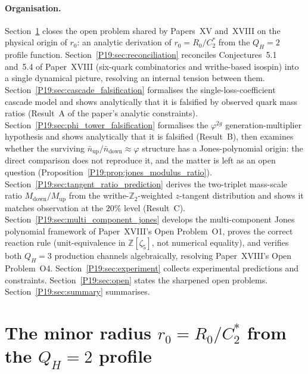 \documentclass[11pt,a4paper]{article}
\theoremstyle{definition}\newtheorem{definition}[theorem]{Definition}
\theoremstyle{remark}
\newcommand{\vp}{\varphi}
\newcommand{\QH}{Q_H}
\newcommand{\Ztwo}{\mathbb{Z}_2}
\begin{document}
\paragraph{Organisation.}
Section~\ref{P19:sec:r0_derivation} closes the open problem shared by
Papers~XV and~XVIII on the physical origin of $r_0$: an analytic
derivation of $r_0=R_0/C_2^*$ from the $\QH=2$ profile function.
Section~\ref{P19:sec:reconciliation} reconciles Conjectures~5.1
and~5.4 of Paper~XVIII (six-quark combinatorics and writhe-based
isospin) into a single dynamical picture, resolving an internal
tension between them.
Section~\ref{P19:sec:cascade_falsification} formalises the
single-loss-coefficient cascade model and shows analytically that
it is falsified by observed quark mass ratios (Result~A of the
paper's analytic constraints).
Section~\ref{P19:sec:phi_tower_falsification} formalises the
$\vp^{2g}$ generation-multiplier hypothesis and shows analytically
that it is falsified (Result~B), then examines whether the surviving
$\bar n_{\mathrm{up}}/\bar n_{\mathrm{down}}\approx\vp$ structure has
a Jones-polynomial origin: the direct comparison does not reproduce
it, and the matter is left as an open question
(Proposition~\ref{P19:prop:jones_modulus_ratio}).
Section~\ref{P19:sec:tangent_ratio_prediction} derives the two-triplet
mass-scale ratio $M_{\mathrm{down}}/M_{\mathrm{up}}$ from the
writhe-$\Ztwo$-weighted $z$-tangent distribution and shows it
matches observation at the $20\%$ level (Result~C).
Section~\ref{P19:sec:multi_component_jones} develops the
multi-component Jones polynomial framework of Paper~XVIII's Open
Problem~O1, proves the correct reaction rule
(unit-equivalence in $\mathbb{Z}[\zeta_5]$, not numerical equality),
and verifies both $\QH=3$ production channels algebraically,
resolving Paper~XVIII's Open Problem~O4.
Section~\ref{P19:sec:experiment} collects experimental predictions
and constraints.
Section~\ref{P19:sec:open} states the sharpened open problems.
Section~\ref{P19:sec:summary} summarises.

\section{The minor radius $r_0 = R_0/C_2^*$ from the $\QH=2$ profile}
\label{P19:sec:r0_derivation}
\end{document}
